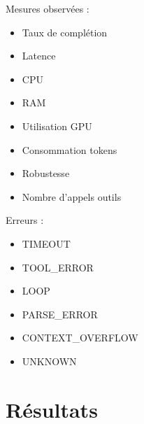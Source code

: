 \documentclass[12pt,a4paper]{article}
\begin{document}
Mesures observées :

\begin{itemize}

\item Taux de complétion

\item Latence

\item CPU

\item RAM

\item Utilisation GPU

\item Consommation tokens

\item Robustesse

\item Nombre d'appels outils

\end{itemize}

Erreurs :

\begin{itemize}

\item TIMEOUT

\item TOOL\_ERROR

\item LOOP

\item PARSE\_ERROR

\item CONTEXT\_OVERFLOW

\item UNKNOWN

\end{itemize}


\section{Résultats}

\end{document}
